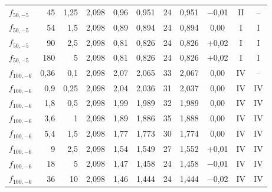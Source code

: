 \begin{tabular}{lrr|ccc|ccc|cc}
$f_{50,-5}$ & 45 & 1{,}25 & 2{,}098 & 0{,}96 & 0{,}951 & 24 & 0{,}951 & $-$0{,}01 & II & --\\
$f_{50,-5}$ & 54 & 1{,}5 & 2{,}098 & 0{,}89 & 0{,}894 & 24 & 0{,}894 & 0{,}00 & I & I\\
$f_{50,-5}$ & 90 & 2{,}5 & 2{,}098 & 0{,}81 & 0{,}826 & 24 & 0{,}826 & $+$0{,}02 & I & I\\
$f_{50,-5}$ & 180 & 5 & 2{,}098 & 0{,}81 & 0{,}826 & 24 & 0{,}826 & $+$0{,}02 & I & I\\
\midrule
$f_{100,-6}$ & 0{,}36 & 0{,}1 & 2{,}098 & 2{,}07 & 2{,}065 & 33 & 2{,}067 & 0{,}00 & IV & --\\
$f_{100,-6}$ & 0{,}9 & 0{,}25 & 2{,}098 & 2{,}04 & 2{,}036 & 31 & 2{,}037 & 0{,}00 & IV & IV\\
$f_{100,-6}$ & 1{,}8 & 0{,}5 & 2{,}098 & 1{,}99 & 1{,}989 & 32 & 1{,}989 & 0{,}00 & IV & IV\\
$f_{100,-6}$ & 3{,}6 & 1 & 2{,}098 & 1{,}89 & 1{,}886 & 35 & 1{,}888 & 0{,}00 & IV & IV\\
$f_{100,-6}$ & 5{,}4 & 1{,}5 & 2{,}098 & 1{,}77 & 1{,}773 & 30 & 1{,}774 & 0{,}00 & IV & IV\\
$f_{100,-6}$ & 9 & 2{,}5 & 2{,}098 & 1{,}54 & 1{,}549 & 27 & 1{,}552 & $+$0{,}01 & IV & IV\\
$f_{100,-6}$ & 18 & 5 & 2{,}098 & 1{,}47 & 1{,}458 & 24 & 1{,}458 & $-$0{,}01 & IV & IV\\
$f_{100,-6}$ & 36 & 10 & 2{,}098 & 1{,}46 & 1{,}444 & 24 & 1{,}444 & $-$0{,}02 & IV & IV\\
\bottomrule
\end{tabular}
